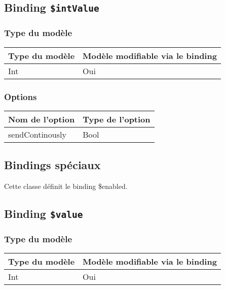 \subsection{Binding \texttt{\$intValue}}

\subsubsection{Type du modèle}

\begin{tabular}{|l|l|}
\hline
\textbf{Type du modèle} & \textbf{Modèle modifiable via le binding}\\
\hline
Int & Oui\\
\hline
\end{tabular}
\subsubsection{Options}

\begin{tabular}{|l|l|}
\hline
\textbf{Nom de l'option} & \textbf{Type de l'option}\\
\hline
sendContinously & Bool\\
\hline
\end{tabular}








\subsection{Bindings spéciaux}

Cette classe définit le binding \$enabled.

\subsection{Binding \texttt{\$value}}

\subsubsection{Type du modèle}

\begin{tabular}{|l|l|}
\hline
\textbf{Type du modèle} & \textbf{Modèle modifiable via le binding}\\
\hline
Int & Oui\\
\hline
\end{tabular}
